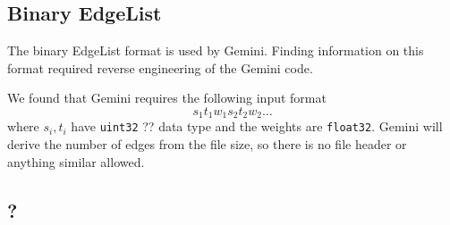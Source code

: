 \subsection{Binary EdgeList}
The binary EdgeList format is used by Gemini. Finding information on this format required reverse engineering of the Gemini code.

We found that Gemini requires the following input format
\begin{equation*}
	s_1t_1w_1s_2t_2w_2\ldots
\end{equation*}
where $s_i,t_i$ have \texttt{uint32} ?? data type and the weights are \texttt{float32}. 
Gemini will derive the number of edges from the file size, so there is no file header or anything similar allowed.

\subsection{?}
